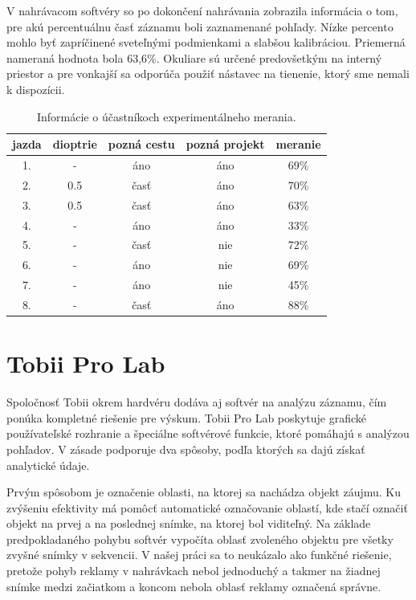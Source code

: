 V nahrávacom softvéry so po dokončení nahrávania zobrazila informácia o tom, pre akú percentuálnu časť záznamu boli zaznamenané pohľady. Nízke percento mohlo byť zapríčinené sveteľnými podmienkami a slabšou kalibráciou. Priemerná nameraná hodnota bola 63,6\%. Okuliare sú určené predovšetkým na interný priestor a pre vonkajší sa odporúča použiť nástavec na tienenie, ktorý sme nemali k dispozícii.
\\
\begin{table}[ht]
\centering
\begin{tabular}{ |c c c c c|  }
\hline
jazda & dioptrie & pozná cestu & pozná projekt & meranie \\
\hline
1. & - & áno & áno & 69\% \\
2. & 0.5 & časť & áno & 70\% \\
3. & 0.5 & časť & áno & 63\% \\
4. & - & áno & áno & 33\% \\
5. & - & časť & nie & 72\% \\
6. & - & áno & nie & 69\% \\
7. & - & áno & nie & 45\% \\
8. & - & časť & áno & 88\% \\
\hline
\end{tabular}
\caption{Informácie o účastníkoch experimentálneho merania.}
\label{table:1}
\end{table}

\section{Tobii Pro Lab}

Spoločnosť Tobii okrem hardvéru dodáva aj softvér na analýzu záznamu, čím ponúka kompletné riešenie pre výskum. Tobii Pro Lab poskytuje grafické používateľské rozhranie a špeciálne softvérové funkcie, ktoré pomáhajú s analýzou pohľadov. V zásade podporuje dva spôsoby, podľa ktorých sa dajú získať analytické údaje.

Prvým spôsobom je označenie oblasti, na ktorej sa nachádza objekt záujmu. Ku zvýšeniu efektivity má pomôcť automatické označovanie oblastí, kde stačí označiť objekt na prvej a na poslednej snímke, na ktorej bol viditeľný. Na základe predpokladaného pohybu softvér vypočíta oblasť zvoleného objektu pre všetky zvyšné snímky v sekvencii. V našej práci sa to neukázalo ako funkčné riešenie, pretože pohyb reklamy v nahrávkach nebol jednoduchý a takmer na žiadnej snímke medzi začiatkom a koncom nebola oblasť reklamy označená správne.

